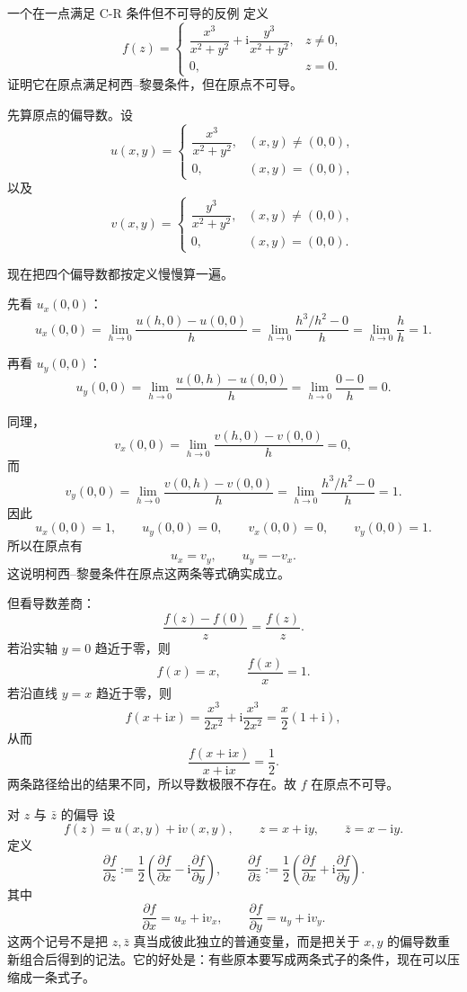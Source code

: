 \begin{lizi}{一个在一点满足 C-R 条件但不可导的反例}{}
定义
\[
    f(z)=
    \begin{cases}
        \dfrac{x^3}{x^2+y^2}+\mathrm{i}\dfrac{y^3}{x^2+y^2}, & z\neq 0,\\[1em]
        0, & z=0.
    \end{cases}
\]
证明它在原点满足柯西--黎曼条件，但在原点不可导。

\begin{jie}
先算原点的偏导数。设
\[
    u(x,y)=
    \begin{cases}
        \dfrac{x^3}{x^2+y^2}, & (x,y)\neq(0,0),\\
        0, & (x,y)=(0,0),
    \end{cases}
\]
以及
\[
    v(x,y)=
    \begin{cases}
        \dfrac{y^3}{x^2+y^2}, & (x,y)\neq(0,0),\\
        0, & (x,y)=(0,0).
    \end{cases}
\]

现在把四个偏导数都按定义慢慢算一遍。

先看 $u_x(0,0)$：
\[
    u_x(0,0)
    =\lim_{h\to 0}\frac{u(h,0)-u(0,0)}{h}
    =\lim_{h\to 0}\frac{h^3/h^2-0}{h}
    =\lim_{h\to 0}\frac{h}{h}
    =1.
\]

再看 $u_y(0,0)$：
\[
    u_y(0,0)
    =\lim_{h\to 0}\frac{u(0,h)-u(0,0)}{h}
    =\lim_{h\to 0}\frac{0-0}{h}
    =0.
\]

同理，
\[
    v_x(0,0)
    =\lim_{h\to 0}\frac{v(h,0)-v(0,0)}{h}
    =0,
\]
而
\[
    v_y(0,0)
    =\lim_{h\to 0}\frac{v(0,h)-v(0,0)}{h}
    =\lim_{h\to 0}\frac{h^3/h^2-0}{h}
    =1.
\]
因此
\[
    u_x(0,0)=1,\qquad u_y(0,0)=0,\qquad v_x(0,0)=0,\qquad v_y(0,0)=1.
\]
所以在原点有
\[
    u_x=v_y,\qquad u_y=-v_x.
\]
这说明柯西--黎曼条件在原点这两条等式确实成立。

但看导数差商：
\[
    \frac{f(z)-f(0)}{z}=\frac{f(z)}{z}.
\]
若沿实轴 $y=0$ 趋近于零，则
\[
    f(x)=x,\qquad \frac{f(x)}{x}=1.
\]
若沿直线 $y=x$ 趋近于零，则
\[
    f(x+\mathrm{i}x)
    =\frac{x^3}{2x^2}+\mathrm{i}\frac{x^3}{2x^2}
    =\frac{x}{2}(1+\mathrm{i}),
\]
从而
\[
    \frac{f(x+\mathrm{i}x)}{x+\mathrm{i}x}=\frac{1}{2}.
\]
两条路径给出的结果不同，所以导数极限不存在。故 $f$ 在原点不可导。
\end{jie}
\end{lizi}

\begin{dingliyi}{对 $z$ 与 $\bar z$ 的偏导}{}
设
\[
    f(z)=u(x,y)+\mathrm{i}v(x,y),\qquad z=x+\mathrm{i}y,\qquad \bar z=x-\mathrm{i}y.
\]
定义
\[
    \frac{\partial f}{\partial z}
    :=\frac12\left(\frac{\partial f}{\partial x}
    -\mathrm{i}\frac{\partial f}{\partial y}\right),\qquad
    \frac{\partial f}{\partial \bar z}
    :=\frac12\left(\frac{\partial f}{\partial x}
    +\mathrm{i}\frac{\partial f}{\partial y}\right).
\]
其中
\[
    \frac{\partial f}{\partial x}=u_x+\mathrm{i}v_x,\qquad
    \frac{\partial f}{\partial y}=u_y+\mathrm{i}v_y.
\]
这两个记号不是把 $z,\bar z$ 真当成彼此独立的普通变量，而是把关于 $x,y$ 的偏导数重新组合后得到的记法。它的好处是：有些原本要写成两条式子的条件，现在可以压缩成一条式子。
\end{dingliyi}


